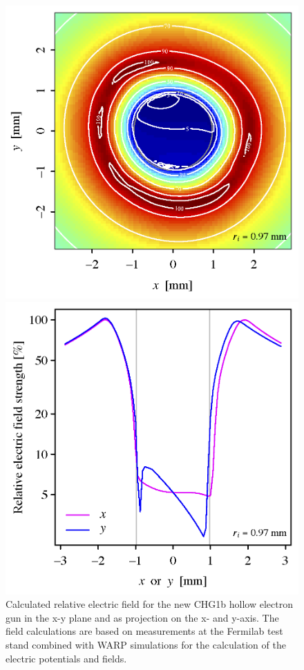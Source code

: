 \documentclass[%
 reprint,
 amsmath,amssymb,
 aps,
prstab,
]{revtex4-1}
\begin{document}
\begin{figure}[h]
	\begin{minipage}[t]{0.49\linewidth}
		\centering
		\includegraphics[width=1.0\linewidth]{CHG1b_170512_8p75A_2-4-2p7kG_500V_76mA_hires_Emap.png}
	\end{minipage}
	\begin{minipage}[t]{0.49\linewidth}
		\centering
		\includegraphics[width=1.0\linewidth]{CHG1b_170512_8p75A_2-4-2p7kG_500V_76mA_hires_Eslice.png}
	\end{minipage}
	\caption{Calculated relative electric field for the new CHG1b hollow electron gun in the x-y plane and as projection on the x- and y-axis. The field calculations are based on measurements at the Fermilab test stand combined with WARP simulations for the calculation of the electric potentials and fields.}
	\label{core:fig:1}
\end{figure}
\end{document}
